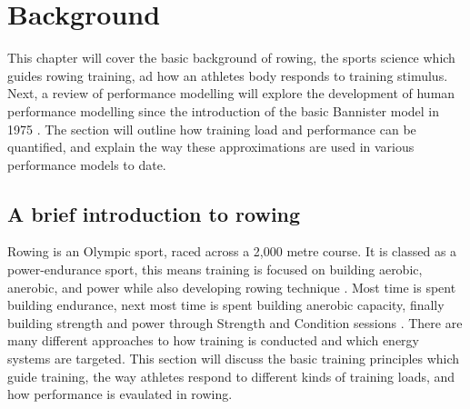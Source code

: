 \chapter{Background}
\label{Chapt2}
This chapter will cover the basic background of rowing, the sports science which guides rowing training, ad how an athletes body responds to training stimulus. Next, a review of performance modelling will explore the development of human performance modelling since the introduction of the basic Bannister model in 1975 \autocite{Bannister1976}. The section will outline how training load and performance can be quantified, and explain the way these approximations are used in various performance models to date.

\section{A brief introduction to rowing}
Rowing is an Olympic sport, raced across a 2,000 metre course. It is classed as a power-endurance sport, this means training is focused on building aerobic, anerobic, and power while also developing rowing technique \autocite{Mäestu2005}. Most time is spent building endurance, next most time is spent building anerobic capacity, finally building strength and power through Strength and Condition sessions \autocite{Seiler2006}. There are many different approaches to how training is conducted and which energy systems are targeted. This section will discuss the basic training principles which guide training, the way athletes respond to different kinds of training loads, and how performance is evaulated in rowing. 

